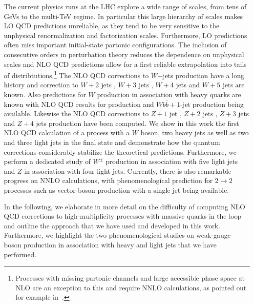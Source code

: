 The current physics runs at the LHC
explore a wide range of scales, from tens of GeVs to the multi-TeV
regime. In particular this large hierarchy of scales makes LO QCD predictions
unreliable, as they tend to be very sensitive to the unphysical renormalization and
factorization scales. Furthermore, LO predictions often miss important
initial-state partonic configurations. The inclusion of consecutive
orders in perturbation theory reduces the dependence on unphysical
scales and NLO QCD predictions allow for a first reliable extrapolation into tails of distribtutions.\footnote{Processes with missing partonic channels and
  large accessible phase space at NLO are
  an exception to this and require NNLO calculations, as pointed out
  for example in~\cite{Rubin:2010xp}.} The NLO QCD corrections to $W$+jets production have a long history \cite{Giele:1993dj} and correction to $W+2$ jets \cite{Bern:1997sc}, $W+3$ jets \cite{BH:W3jDistributions}, $W+4$ jets \cite{BH:W4j} and $W+5$ jets \cite{BH:W5j} are known. Also predictions for $W$ production in association with heavy quarks are known with NLO QCD results for \Wbb{} production \cite{FebresCordero:2006sj} and $Wb\bar{b}+1$-jet production \cite{Luisoni:2015mpa} being available. Likewise the NLO QCD corrections to $Z+1$ jet \cite{Giele:1993dj}, $Z+2$ jets \cite{Campbell:2002tg}, $Z+3$ jets \cite{Berger:2010vm} and $Z+4$ jets \cite{BH:Z4j} production have been computed. We show in this work the first NLO QCD calculation of a
process with a $W$ boson, two heavy jets as well as two and three light jets in the final state and demonstrate how the quantum corrections
considerably stabilize the theoretical predictions. Furthermore, we perform a dedicated study of $W^\pm$ production in association with five light jets and $Z$ in
association with four light jets. Currently, there is also remarkable progress on NNLO calculations, with phenomenological
prediction for $2\rightarrow 2$ processes such as vector-boson
production with a single jet
\cite{Boughezal:2015dva,Boughezal:2015ded,Gehrmann-DeRidder:2016zml} being
available. 






In the following, we elaborate in more detail on the
difficulty of computing NLO QCD corrections to high-multiplicity processes with
massive quarks in the loop and outline the approach that we have used
and developed in this
work. Furthermore, we highlight the two phenomenological studies on weak-gauge-boson production in association with heavy and light
jets that we have performed.



